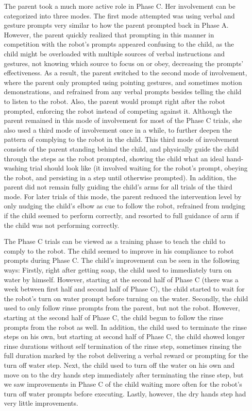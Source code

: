 \documentclass{ut-thesis}
\begin{document}
The parent took a much more active role in Phase C.  Her involvement can be categorized into three modes.  The first mode attempted was using verbal and gesture prompts very similar to how the parent prompted back in Phase A.  However, the parent quickly realized that prompting in this manner in competition with the robot's prompts appeared confusing to the child, as the child might be overloaded with multiple sources of verbal instructions and gestures, not knowing which source to focus on or obey, decreasing the prompts' effectiveness.  As a result, the parent switched to the second mode of involvement, where the parent only prompted using pointing gestures, and sometimes motion demonstrations, and refrained from any verbal prompts besides telling the child to listen to the robot.  Also, the parent would prompt right after the robot prompted, enforcing the robot instead of competing against it.  Although the parent remained in this mode of involvement for most of the Phase C trials, she also used a third mode of involvement once in a while, to further deepen the pattern of complying to the robot in the child.  This third mode of involvement consists of the parent standing behind the child, and physically guide the child through the steps as the robot prompted, showing the child what an ideal hand-washing trial should look like (it involved waiting for the robot's prompt, obeying the robot, and persisting in a step until otherwise prompted).  In addition, the parent did not remain fully guiding the child's arms for all trials of the third mode.  For later trials of this mode, the parent reduced the intervention level by only nudging the child's elbow as cue to follow the robot, refrained from nudging if the child seemed to perform correctly, and resorted to full guidance of arm if the child was not performing correctly.

The Phase C trials can be viewed as a training phase to teach the child to comply to the robot.  The child seemed to improve in his compliance to robot prompts during Phase C.  The child's improvement can be seen in the following ways:  Firstly, right after getting soap, the child used to immediately turn on water by himself.  However, starting at the second half of Phase C (there was a week between first half and second half of Phase C), the child started to wait for the robot's turn on water prompt before turning on the water.  Secondly, the child used to only follow rinse prompts from the parent, but not the robot.  However, starting at the second half of Phase C, the child begun to follow the rinse prompts from the robot as well.  In addition, the child used to terminate the rinse steps on his own, but starting at second half of Phase C, the child showed longer rinse durations without self termination of the rinse step, sometimes rinsing the full duration marked by the robot delivering a verbal reward or prompting for the turn off water step.  Next, the child used to turn off the water on his own and move on to the dry hands step immediately after terminating the rinse step, but we saw improvements in Phase C of the child waiting more often for the robot's turn off water prompts before executing.  Lastly, however, the dry hands step had very little improvements.
\end{document}

